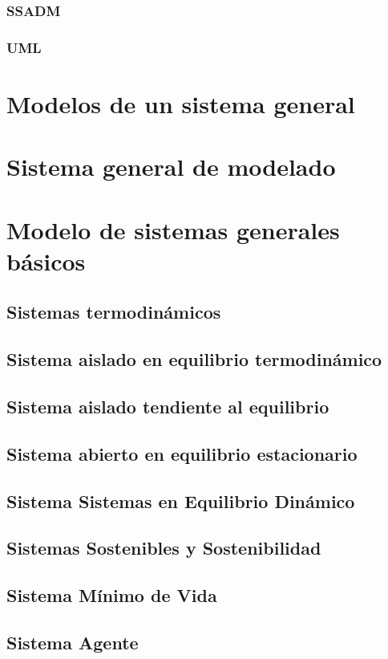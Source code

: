 \subsubsection{SSADM}

\subsubsection{UML}

\section{Modelos de un sistema general}
\section{Sistema general de modelado}
\section{Modelo de sistemas generales básicos}
\subsection{Sistemas termodinámicos}
\subsection{Sistema aislado en equilibrio termodinámico}
\subsection{Sistema aislado tendiente al equilibrio}
\subsection{Sistema abierto en equilibrio estacionario}
\subsection{Sistema Sistemas en Equilibrio Dinámico}
\subsection{Sistemas Sostenibles y Sostenibilidad}
\subsection{Sistema Mínimo de Vida}
\subsection{Sistema Agente}
